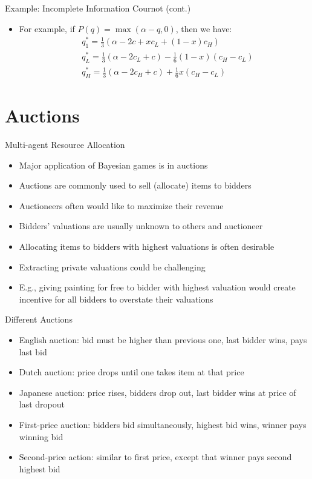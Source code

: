 \documentclass[11pt,aspectratio=169,handout]{beamer}
\begin{document}
  \begin{frame}{Example: Incomplete Information Cournot (cont.)}
   \begin{itemize}
    \item For example, if $P(q) = \max(\alpha - q, 0)$, then we have:
    \vspace{1.2em}
    \begin{align*}
     & q_1^*=\frac{1}{3}(\alpha - 2c + x c_L + (1-x) c_H) \\[1.2em]
     & q_L^*=\frac{1}{3}(\alpha - 2c_L + c) - \frac{1}{6}(1 - x)(c_H - c_L) \\[1.2em]
     & q_H^*=\frac{1}{3}(\alpha - 2c_H + c) + \frac{1}{6}x(c_H - c_L)
    \end{align*}
   \end{itemize}
  \end{frame}
  
 \section{Auctions}
 
  \begin{frame}{Multi-agent Resource Allocation}
   \begin{itemize}[<+->]
   \setlength{\itemsep}{0.7em}
    \item Major application of Bayesian games is in \alert{auctions}
    \item Auctions are commonly used to sell (allocate) items to \alert{bidders}
    \item Auctioneers often would like to maximize their \alert{revenue}
    \item Bidders' valuations are usually \alert{unknown} to others and auctioneer
    \item Allocating items to bidders with \alert{highest valuations} is often desirable
    \item Extracting private valuations could be challenging
    \item E.g., giving painting for free to bidder with highest valuation would create incentive for all bidders to overstate their valuations
   \end{itemize}
  \end{frame}


  \begin{frame}{Different Auctions}
   \begin{itemize}[<+->] \small
   \setlength{\itemsep}{1.2em}
    \item \alert{English auction}: bid must be higher than previous one, last bidder wins, pays last bid
    \item \alert{Dutch auction}: price drops until one takes item at that price
    \item \alert{Japanese auction}: price rises, bidders drop out, last bidder wins at price of last dropout
    \item \alert{First-price auction}: bidders bid simultaneously, highest bid wins, winner pays winning bid
    \item \alert{Second-price action}: similar to first price, except that winner pays second highest bid
   \end{itemize}
  \end{frame}
\end{document}
